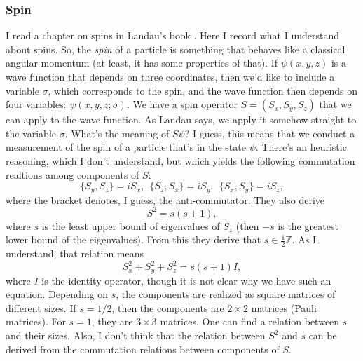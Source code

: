 \subsubsection{Spin}
I read a chapter on spins in Landau's book \cite{landau}. Here I record what I understand about spins. So, the \emph{spin} of a particle is something that behaves like a classical angular momentum (at least, it has some properties of that). If $\psi(x,y,z)$ is a wave function that depends on three coordinates, then we'd like to include a variable $\sigma$, which corresponds to the spin, and the wave function then depends on four variables: $\psi(x,y,z;\sigma)$. We have a spin operator $S = (S_x,S_y,S_z)$ that we can apply to the wave function. As Landau says, we apply it somehow straight to the variable $\sigma$. What's the meaning of $S\psi$? I guess, this means that we conduct a measurement of the spin of a particle that's in the state $\psi$. There's an heuristic reasoning, which I don't understand, but which yields the following commutation realtions among components of $S$:
\[
\{S_y,S_z\} = iS_x, \ \ \{S_z,S_x\} = iS_y, \ \ \{S_x,S_y\} = iS_z,
\]
where the bracket denotes, I guess, the anti-commutator.
They also derive
\[
S^2 = s(s+1),
\]
where $s$ is the least upper bound of eigenvalues of $S_z$ (then $-s$ is the greatest lower bound of the eigenvalues). From this they derive that $s \in \frac{1}{2}\mathbb{Z}$. As I understand, that relation means
\[
S_x^2 + S_y^2 + S_z^2 = s(s+1) I,
\]
where $I$ is the identity operator, though it is not clear why we have such an equation. Depending on $s$, the components are realized as square matrices of different sizes. If $s = 1/2$, then the components are $2 \times 2$ matrices (Pauli matrices). For $s = 1$, they are $3 \times 3$ matrices. One can find a relation between $s$ and their sizes. Also, I don't think that the relation between $S^2$ and $s$ can be derived from the commutation relations between components of $S$.


